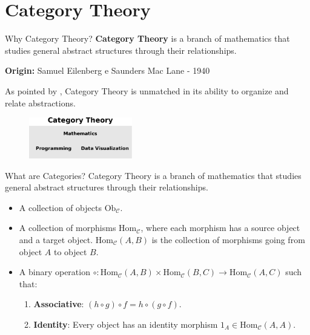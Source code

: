\documentclass[aspectratio=169,xcolor=dvipsnames,10pt]{beamer}
\begin{document}
\section{Category Theory}
\begin{frame}[fragile]{Why Category Theory?}
	\textbf{Category Theory} is a branch of mathematics that
	studies general abstract structures through their relationships.
	\vspace{3mm}

	\textbf{Origin: }Samuel Eilenberg e Saunders Mac Lane - 1940
	\vspace{3mm}

	As pointed by \citet{fong2019invitation}, Category Theory is unmatched
	in its ability to organize and relate abstractions.

	\vspace{3mm}
	\begin{figure}[H]
		\begin{center}
			\includegraphics[width=0.40\textwidth]{./figures/category-triad.pdf}
		\end{center}
	\end{figure}
\end{frame}

\begin{frame}[fragile]{What are Categories?}
	Category Theory is a branch of mathematics that
	studies general abstract structures through their relationships.

	\begin{definition}[Category]
        \begin{itemize}
            \item A collection of objects $\mathrm{Ob}_{\mathcal{C}}$.
            \item A collection of morphisms $\mathrm{Hom}_{\mathcal{C}}$, where each morphism has a source object and a target object. $\mathrm{Hom}_{\mathcal{C}}(A, B)$ is the collection of morphisms going from object $A$ to object $B$.
            \item A binary operation $\circ : \mathrm{Hom}_{\mathcal{C}}(A, B) \times \mathrm{Hom}_{\mathcal{C}}(B, C) \to \mathrm{Hom}_{\mathcal{C}}(A, C)$ such that:
            \begin{enumerate}
                \item \textbf{Associative}: $(h \circ g) \circ f = h \circ (g \circ f)$.
                \item \textbf{Identity}: Every object has an identity morphism $1_A \in \mathrm{Hom}_{\mathcal{C}}(A, A)$.
            \end{enumerate}
        \end{itemize}
	\end{definition}
\end{frame}
\end{document}
